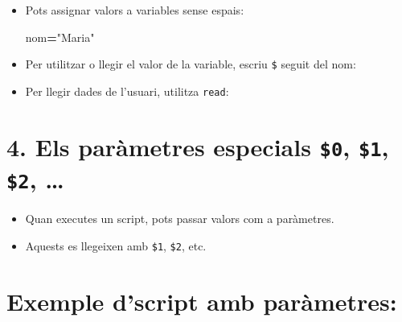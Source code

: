 \documentclass[
  12 pt,
  a4paper,
]{article}
\newenvironment{Shaded}{\begin{snugshade}}{\end{snugshade}}
\newcommand{\BuiltInTok}[1]{#1}
\newcommand{\CommentTok}[1]{\textcolor[rgb]{0.56,0.35,0.01}{\textit{#1}}}
\newcommand{\OperatorTok}[1]{\textcolor[rgb]{0.81,0.36,0.00}{\textbf{#1}}}
\newcommand{\StringTok}[1]{\textcolor[rgb]{0.31,0.60,0.02}{#1}}
\newcommand{\VariableTok}[1]{\textcolor[rgb]{0.00,0.00,0.00}{#1}}
\providecommand{\tightlist}{%
  \setlength{\itemsep}{0pt}\setlength{\parskip}{0pt}}
\begin{document}
\begin{itemize}
\item
  Pots assignar valors a variables sense espais:

\begin{Shaded}
\begin{Highlighting}[]
\VariableTok{nom}\OperatorTok{=}\StringTok{"Maria"}
\end{Highlighting}
\end{Shaded}
\item
  Per utilitzar o llegir el valor de la variable, escriu \texttt{\$}
  seguit del nom:

\begin{Shaded}
\end{Shaded}
\item
  Per llegir dades de l'usuari, utilitza \texttt{read}:

\begin{Shaded}
\end{Shaded}
\end{itemize}

\section{\texorpdfstring{4. Els paràmetres especials \texttt{\$0},
\texttt{\$1}, \texttt{\$2},
\ldots{}}{4. Els paràmetres especials \$0, \$1, \$2, \ldots{}}}\label{els-paruxe0metres-especials-0-1-2}

\begin{itemize}
\tightlist
\item
  Quan executes un script, pots passar valors com a paràmetres.\\
\item
  Aquests es llegeixen amb \texttt{\$1}, \texttt{\$2}, etc.
\end{itemize}

\section{Exemple d'script amb
paràmetres:}\label{exemple-dscript-amb-paruxe0metres}
\end{document}
